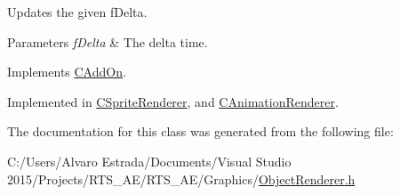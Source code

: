 Updates the given f\+Delta. 


\begin{DoxyParams}{Parameters}
{\em f\+Delta} & The delta time. \\
\hline
\end{DoxyParams}


Implements \hyperlink{class_c_add_on_af7d49c59fd975bcc7b98e14f437cc1ae}{C\+Add\+On}.



Implemented in \hyperlink{class_c_sprite_renderer_a7923c1ef70f2f8adc172a94ce743e67b}{C\+Sprite\+Renderer}, and \hyperlink{class_c_animation_renderer_a2ac2237cb706d2f6d45a88a86543e008}{C\+Animation\+Renderer}.



The documentation for this class was generated from the following file\+:\begin{DoxyCompactItemize}
\item 
C\+:/\+Users/\+Alvaro Estrada/\+Documents/\+Visual Studio 2015/\+Projects/\+R\+T\+S\+\_\+\+A\+E/\+R\+T\+S\+\_\+\+A\+E/\+Graphics/\hyperlink{_object_renderer_8h}{Object\+Renderer.\+h}\end{DoxyCompactItemize}
